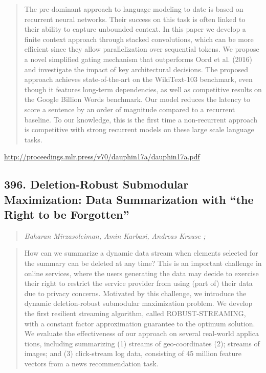 \documentclass{article}
\begin{document}
\begin{quote}
    The pre-dominant approach to language modeling to date is based on recurrent neural networks. Their success on this task is often linked to their ability to capture unbounded context. In this paper we develop a finite context approach through stacked convolutions, which can be more efficient since they allow parallelization over sequential tokens. We propose a novel simplified gating mechanism that outperforms Oord et al. (2016) and investigate the impact of key architectural decisions. The proposed approach achieves state-of-the-art on the WikiText-103 benchmark, even though it features long-term dependencies, as well as competitive results on the Google Billion Words benchmark. Our model reduces the latency to score a sentence by an order of magnitude compared to a recurrent baseline. To our knowledge, this is the first time a non-recurrent approach is competitive with strong recurrent models on these large scale language tasks.  \end{quote}

\href{http://proceedings.mlr.press/v70/dauphin17a/dauphin17a.pdf}{http://proceedings.mlr.press/v70/dauphin17a/dauphin17a.pdf}

\subsection{396. Deletion-Robust Submodular Maximization: Data Summarization with “the Right to be Forgotten”}

\begin{quote}
\footnotesize{\textit{Baharan Mirzasoleiman, Amin Karbasi, Andreas Krause ;}}
\end{quote}

\begin{quote}
    How can we summarize a dynamic data stream when elements selected for the summary can be deleted at any time? This is an important challenge in online services, where the users generating the data may decide to exercise their right to restrict the service provider from using (part of) their data due to privacy concerns. Motivated by this challenge, we introduce the dynamic deletion-robust submodular maximization problem. We develop the first resilient streaming algorithm, called ROBUST-STREAMING, with a constant factor approximation guarantee to the optimum solution. We evaluate the effectiveness of our approach on several real-world applica tions, including summarizing (1) streams of geo-coordinates (2); streams of images; and (3) click-stream log data, consisting of 45 million feature vectors from a news recommendation task.  \end{quote}
\end{document}
